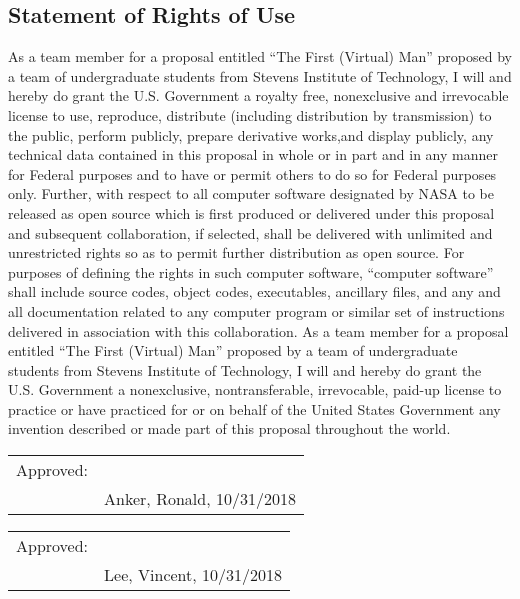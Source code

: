 \documentclass{article}
\let\Oldsubsection\subsection
\renewcommand{\subsection}{\FloatBarrier\Oldsubsection}
\begin{document}
\newpage

\subsection{Statement of Rights of Use}

As a team member for a proposal entitled “The First (Virtual) Man” proposed by a team of undergraduate students from Stevens Institute of Technology, I will and hereby do grant the U.S. Government a royalty free, nonexclusive and irrevocable license to use, reproduce, distribute (including distribution by transmission) to the public, perform publicly, prepare derivative works,and display publicly, any technical data contained in this proposal in whole or in part and in any manner for Federal purposes and to have or permit others to do so for
Federal purposes only. Further, with respect to all computer software designated by
NASA to be released as open source which is first produced or delivered under this
proposal and subsequent collaboration, if selected, shall be delivered with unlimited and
unrestricted rights so as to permit further distribution as open source. For purposes of
defining the rights in such computer software, “computer software” shall include source
codes, object codes, executables, ancillary files, and any and all documentation related
to any computer program or similar set of instructions delivered in association with this
collaboration. As a team member for a proposal entitled “The First (Virtual) Man” proposed by a team of undergraduate students from Stevens Institute of Technology, I will and hereby do
grant the U.S. Government a nonexclusive, nontransferable, irrevocable, paid-up
license to practice or have practiced for or on behalf of the United States Government
any invention described or made part of this proposal throughout the world.

\bigskip
\bigskip
\bigskip

\begin{tabular}{@{}p{.5in}p{3.5in}@{}}
Approved: & \hrulefill \\
& Anker, Ronald, 10/31/2018\\
\end{tabular}

\bigskip
\bigskip
\bigskip

\begin{tabular}{@{}p{.5in}p{3.5in}@{}}
Approved: & \hrulefill \\
& Lee, Vincent, 10/31/2018\\
\end{tabular}
\end{document}
